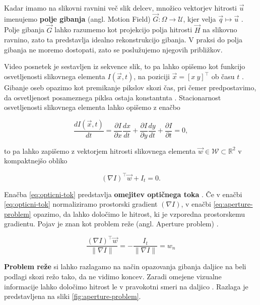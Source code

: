 Kadar imamo na slikovni ravnini več slik delcev, množico vektorjev hitrosti $\vec{u}$ imenujemo \textbf{polje gibanja} (angl. Motion Field) $\vec{G} : \mathit{\Omega} \to \mathcal{U}$, kjer velja $ \vec{q} \mapsto \vec{u}$ \cite{trucco1998introductory}. Polje gibanja $\vec{G}$ lahko razumemo kot projekcijo polja hitrosti $\vec{H}$ na slikovno ravnino, zato ta predstavlja idealno rekonstrukcijo gibanja. V praksi do polja gibanja ne moremo dostopati, zato se poslužujemo njegovih približkov.  

Video posnetek je sestavljen iz sekvence slik, to pa lahko opišemo kot funkcijo osvetljenosti slikovnega elementa $I(\vec{x},t)$, na poziciji $\vec{x} = [x~y]^\top$ ob času $t$ \cite{wedel2011stereo}. Gibanje oseb opazimo kot premikanje pikslov skozi čas, pri čemer predpostavimo, da osvetljenost posameznega piklsa ostaja konstantnta \cite{trucco1998introductory}. Stacionarnost osvetljenosti slikovnega elementa lahko opišemo z enačbo  

\begin{equation}
	\frac{d I(\vec{x}, t)}{dt} = \frac{\partial I}{\partial x} \frac{dx}{dt} + \frac{\partial I}{\partial y} \frac{dy}{dt} + \frac{\partial I}{\partial t} = 0,
\end{equation}

to pa lahko zapišemo z vektorjem hitrosti slikovnega elementa $\vec{w} \in \mathcal{W} \subset \mathbb{R}^2$ v kompaktnejšo obliko

\begin{equation}\label{eq:opticni-tok}
	(\nabla I)^\top \vec{w} + I_t = 0.
\end{equation}

Enačba \eqref{eq:opticni-tok} predstavlja \textbf{omejitev optičnega toka} \cite{trucco1998introductory}. Če v enačbi \eqref{eq:opticni-tok} normaliziramo prostorski gradient $(\nabla I)$, v enačbi \eqref{eq:aperture-problem} opazimo, da lahko  določimo le hitrost, ki je vzporedna prostorskemu gradientu. Pojav je znan kot problem reže (angl. Aperture problem) \cite{trucco1998introductory}. 

\begin{equation}\label{eq:aperture-problem}
	\frac{(\nabla I)^\top \vec{w}}{\| \nabla I \|} = - \frac{I_t}{\| \nabla I \|} = w_n
\end{equation}

\textbf{Problem reže} si lahko razlagamo na način opazovanja gibanja daljice na beli podlagi skozi režo tako, da ne vidimo koncev. Zaradi omejene vizualne informacije lahko določimo hitrost le v pravokotni smeri na daljico \cite{trucco1998introductory}. Razlaga je predstavljena na sliki \ref{fig:aperture-problem}.




